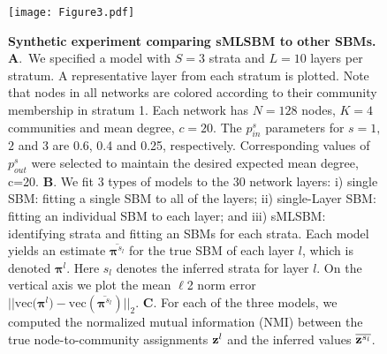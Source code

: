 {\begin{figure}
\begin{center}
\label{fig:SynExp1}
\texttt{[image: Figure3.pdf]}
\caption{{\bf \noindent Synthetic experiment comparing sMLSBM to other SBMs.} 
%
{\bf A}.~We specified a model with $S=3$ strata and $L=10$ layers per stratum. A representative layer from each stratum is plotted. Note that nodes in all networks are colored according to their community membership in stratum 1. Each network has $N=128$ nodes, $K=4$ communities and mean degree, $c=20$. The $p_{in}^s$ parameters for $s=1,$ $2$ and 3 are 0.6, 0.4 and 0.25, respectively. Corresponding values of $p_{out}^s$ were selected to maintain the desired expected mean degree, c=20. 
%
{\bf B}. We fit 3 types of models to the 30 network layers:
i) single SBM: fitting a single SBM to all of the layers;
ii) single-Layer SBM: fitting an individual SBM to each layer; and
iii) sMLSBM: identifying strata and fitting an SBMs for each strata. 
Each model yields an estimate $\overline{{\boldsymbol \pi}^{s_l}}$ for the true SBM of each layer $l$, which is denoted ${{\boldsymbol \pi}}^{l}$. Here $s_l$ denotes the inferred strata for layer $l$.
On the vertical axis we plot the mean $\ell$2 norm error 
$||\text{vec}({\boldsymbol \pi^{l})}-\text{vec}(\overline{{\boldsymbol \pi}^{s_{l}}})||_{2}$. 
 {\bf C}. For each of the three models, we computed the normalized mutual information (NMI) between the true node-to-community assignments ${{\bf z}^{l}}$ and the inferred values $\overline{{\bf z}^{s_l}}$.}
 
\end{center}
\end{figure} 

}
